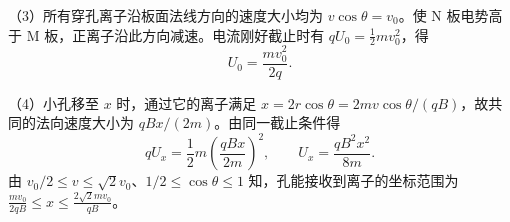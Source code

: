 \documentclass[\gkver]{gaokaozhenti}
\begin{document}
\begin{enumerate}
{（3）所有穿孔离子沿板面法线方向的速度大小均为 $v\cos\theta=v_0$。使 N 板电势高于 M 板，正离子沿此方向减速。电流刚好截止时有 $qU_0=\frac12mv_0^2$，得
\[
U_0=\frac{mv_0^2}{2q}.
\]

（4）小孔移至 $x$ 时，通过它的离子满足 $x=2r\cos\theta=2mv\cos\theta/(qB)$，故共同的法向速度大小为 $qBx/(2m)$。由同一截止条件得
\[
qU_x=\frac12m\left(\frac{qBx}{2m}\right)^2,\qquad U_x=\frac{qB^2x^2}{8m}.
\]
由 $v_0/2\leq v\leq\sqrt{2}v_0$、$1/2\leq\cos\theta\leq1$ 知，孔能接收到离子的坐标范围为 $\frac{mv_0}{2qB}\leq x\leq\frac{2\sqrt{2}mv_0}{qB}$。
}

\end{enumerate}
\end{document}
